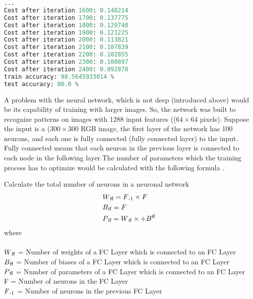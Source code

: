 \begin{lstlisting}[captionpos=b,label={lst:acc2l}, float=tb,language=Python, caption=Test accuracy is 80\% after iteration 2400 times and using 209 examples with 12288 features (\(64\times64 \) pixels). This is not state of the art but very good if considering that this is an algorihm wich is not spezialised to recoginize images.]
...
Cost after iteration 1600: 0.148214
Cost after iteration 1700: 0.137775
Cost after iteration 1800: 0.129740
Cost after iteration 1900: 0.121225
Cost after iteration 2000: 0.113821
Cost after iteration 2100: 0.107839
Cost after iteration 2200: 0.102855
Cost after iteration 2300: 0.100897
Cost after iteration 2400: 0.092878
train accuracy: 98.5645933014 %
test accuracy: 80.0 %
\end{lstlisting} A problem with the neural network, which is not deep (introduced above) would be its capability of training with larger images. So, the network was built to recognize patterns on images with 1288 input features ((\( 64 \times 64\) pixels). Suppose the input is a (\( 300 \times 300\) RGB image, the first layer of the network has 100 neurons, and each one is fully connected (fully connected layer) to the input. Fully connected means that each neuron in the previous layer is connected to each node in the following layer.The number of parameters which the training process has to optimize would be calculated with the following formula \cite{Vasudev2019}\cite{DBLP:journals/corr/TraskGR15}.

\begin{definition}[label=cn]{Calculate the total number of neurons in a neuronal network}
	\begin{align*}
	& W\textsubscript{ff} = F\textsubscript{-1}\times F \\
	& B\textsubscript{ff} = F \\
	& P\textsubscript{ff} = W\textsubscript{ff}\times +  B\textsuperscript{ff}
	\end{align*}
	where \\\\
	\(W\textsubscript{ff}\) = Number of weights of a FC Layer which is connected to an FC Layer \\
	\(B\textsubscript{ff}\) = Number of biases of a FC Layer which is connected to an FC Layer \\
	\(P\textsubscript{ff}\) = Number of parameters of a FC Layer which is connected to an FC Layer \\
	F = Number of neurons in the FC Layer\\
	\(F\textsubscript{-1}\) = Number of neurons in the previous FC Layer
\end{definition}

